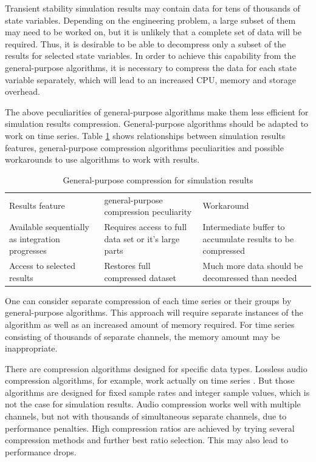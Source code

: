 \documentclass[conference]{IEEEtran}
\begin{document}
Transient stability simulation results may contain data for tens of thousands of state variables.
Depending on the engineering problem, a large subset of them may need to be worked on, but it is unlikely that a complete set of data will be required.
Thus, it is desirable to be able to decompress only a subset of the results for selected state variables. 
In order to achieve this capability from the general-purpose algorithms, it is necessary to compress the data for each 
state variable separately, which will lead to an increased CPU, memory and storage overhead.

The above peculiarities of general-purpose algorithms make them less efficient for simulation 
results compression. General-purpose algorithms should be adapted to work on time series. 
Table \ref{tab:gpcompr} shows relationships between simulation results features, general-purpose
compression algorithms peculiarities and possible workarounds to use algorithms to work with
results.

\begin{table}[!h]
	\caption{General-purpose compression for simulation results\label{tab:gpcompr}}
	\centering
	\begin{tabularx}{\columnwidth}{ 
			>{\raggedright\arraybackslash}X 
			| >{\raggedright\arraybackslash}X 
			| >{\raggedright\arraybackslash}X }
		\hline
		Results feature & general-purpose compression peculiarity & Workaround\\
		\hlineB{3}	
		Available sequentially as integration progresses & 
		Requires access to full data set or it's large parts  &
		Intermediate buffer to accumulate results to be compressed\\
		\hline
		Access to selected results & 
		Restores full compressed dataset & 
		Much more data should be decomressed than needed\\
		\hline
	\end{tabularx}
\end{table}

One can consider separate compression of each time series or their groups by
general-purpose algorithms. This approach will require separate instances
of the algorithm as well as an increased amount of memory required. For time series
consisting of thousands of separate channels, the memory amount may be inappropriate.

There are compression algorithms designed for specific data types. Lossless audio compression
algorithms, for example, work actually on time series \cite{lch03}. But those 
algorithms are designed for fixed sample rates and integer sample values, 
which is not the case for simulation results. Audio compression works well
with multiple channels, but not with thousands of simultaneous separate channels,
due to performance penalties. High compression ratios are achieved by trying
several compression methods and further best ratio selection. 
This may also lead to performance drops.
\end{document}

